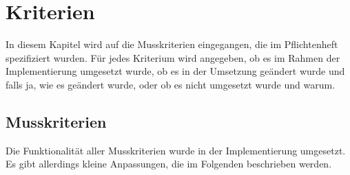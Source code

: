
\chapter{Kriterien}
\label{chap:kriterien}

In diesem Kapitel wird auf die Musskriterien eingegangen, die im Pflichtenheft spezifiziert wurden.
Für jedes Kriterium wird angegeben, ob es im Rahmen der Implementierung umgesetzt wurde,
ob es in der Umsetzung geändert wurde und falls ja, wie es geändert wurde,
oder ob es nicht umgesetzt wurde und warum.

\section{Musskriterien}\label{sec:musskriterien}

Die Funktionalität aller Musskriterien wurde in der Implementierung umgesetzt.
Es gibt allerdings kleine Anpassungen, die im Folgenden beschrieben werden.

